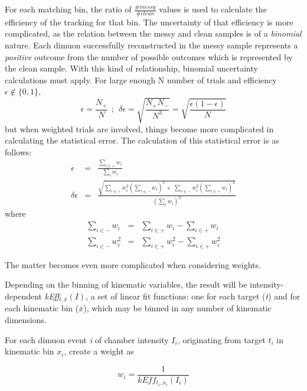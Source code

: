 For each matching bin, the ratio of $\frac{\#messy}{\#clean}$ values is used to calculate the efficiency of the tracking for that bin. The uncertainty of that efficiency is more complicated, as the relation between the messy and clean samples is of a \emph{binomial} nature. Each dimuon successfully reconstructed in the messy sample represents a \emph{positive} outcome from the number of possible outcomes which is represented by the clean sample. With this kind of relationship, binomial uncertainty calculations must apply. For large enough N number of trials and efficiency $\epsilon\notin \{0,1\}$,
\begin{equation}
\epsilon = \frac{N_+}{N}\ \ ;\ \ \delta\epsilon = \sqrt{\frac{N_+ N_-}{N^3}} = \sqrt{\frac{\epsilon(1-\epsilon)}{N}}
\label{eq:binomial-naive}
\end{equation}
but when weighted trials are involved, things become more complicated in calculating the statistical error. The calculation of this statistical error\cite{blist:binomial} is as follows:
\begin{eqnarray}
	\epsilon & = & \frac{\sum\limits_{i\in+}w_i}{\sum\limits_i w_i} \\
	\delta\epsilon & = & \frac{\sqrt{\sum\limits_{i\in+} w_i^2 \left(\sum\limits_{i\in-} w_i \right)^2 + \
			\sum\limits_{e\in-} w_i^2 \left(\sum\limits_{i\in+} w_i \right)^2}} {\left(\sum\limits_{i}w_i\right)^2}
	\label{eq:binomial-weighted}
\end{eqnarray}
where
\begin{eqnarray}
\sum\limits_{i\in-} w_i & = & \sum\limits_{i\in+}w_i - \sum\limits_{i\in+}w_i \\
\sum\limits_{i\in-} w_i^2 & = & \sum\limits_{i\in+}w_i^2 - \sum\limits_{i\in+}w_i^2 
\end{eqnarray}


The matter becomes even more complicated when considering weights.

Depending on the binning of kinematic variables, the result will be intensity-dependent \emph{kEff}$_{t,\bar{x}}(I)$, a set of linear fit functions: one for each target (\emph{t}) and for each kinematic bin ($\bar{x}$), which may be binned in any number of kinematic dimensions.

For each dimuon event \emph{i} of chamber intensity $I_i$, originating from target $t_i$ in kinematic bin $x_i$, create a weight as

\begin{equation}
w_i = \frac{1}{kEff_{t_i, x_i}(I_i)}
\end{equation}

